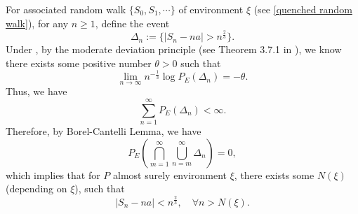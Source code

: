 \documentclass[]{article}
\numberwithin{equation}{section}
\theoremstyle{thmstyleone}%
\theoremstyle{thmstyletwo}%
\theoremstyle{thmstylethree}%
\theoremstyle{thmstylefour}%
\theoremstyle{thmstylefive}%
\theoremstyle{thmstylesix}%
\begin{document}
	For associated random walk $\{S_0,S_1,\cdots\}$ of environment $\xi$ (see \cref{quenched random walk}), 
	for any $n\geqslant1$, define the event
	\begin{equation*}
		\Delta_n:=\{|S_n-na|>n^{\frac{2}{3}}\}.
	\end{equation*}
	Under , by the moderate deviation principle (see Theorem 3.7.1 in \cite{LDP1998}), we know there exists some positive number $\theta>0$ such that
	\begin{equation*}
		\lim\limits_{n\rightarrow\infty} n^{-\frac{1}{3}}\log P_E(\Delta_n) = -\theta.
	\end{equation*}
	Thus, we have
	\begin{equation*}
		\sum_{n=1}^{\infty} P_E(\Delta_n)<\infty.
	\end{equation*}
	Therefore, by Borel-Cantelli Lemma, we have
	\begin{equation*}
		P_E\left(
		\bigcap\limits_{m=1}^\infty\bigcup\limits_{n=m}^\infty \Delta_n
		\right) = 0,
	\end{equation*}
	which implies that for $P$ almost surely environment $\xi$, there exists some $N(\xi)$ (depending on $\xi$), such that
	\begin{equation}\label{addition 1}
		|S_n-na|<n^{\frac{2}{3}}, \quad \forall n>N(\xi).
	\end{equation}
	
\end{document}

